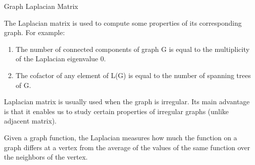 \begin{frame}{Graph Laplacian Matrix}

The Laplacian matrix is used to compute some properties of its corresponding graph. For example:

\begin{enumerate} 
	\item The number of connected components of graph G is equal to the multiplicity of the Laplacian eigenvalue 0.
	\item The cofactor of any element of L(G) is equal to the number of spanning trees of G.
\end{enumerate}

\medskip

Laplacian matrix is usually used when the graph is irregular. Its main advantage is that it enables us to study certain properties of irregular graphs (unlike adjacent matrix).

\medskip

Given a graph function, the Laplacian measures how much the function on a graph differs at a vertex from the average of the values of the same function over the neighbors of the vertex. 

\end{frame}



